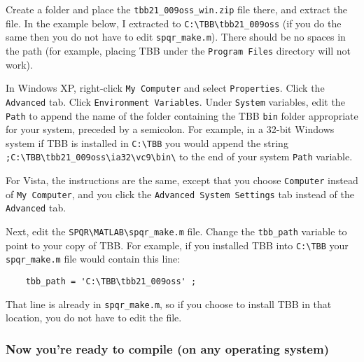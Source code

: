 \documentclass[12pt]{article}
\begin{document}
Create a folder and place the \verb'tbb21_009oss_win.zip' file there, and
extract the file.  In the example below, I extracted to
\verb'C:\TBB\tbb21_009oss' (if you do the same then you do not have to edit
\verb'spqr_make.m').  There should be no spaces in the path (for example,
placing TBB under the \verb'Program Files' directory will not work).

In Windows XP, right-click \verb'My Computer' and select \verb'Properties'.
Click the \verb'Advanced' tab.  Click \verb'Environment Variables'.  Under
\verb'System' variables, edit the \verb'Path' to append the name of the folder
containing the TBB \verb'bin' folder appropriate for your system, preceded by a
semicolon.  For example, in a 32-bit Windows system if TBB is installed in
\verb'C:\TBB' you would append the string
\verb';C:\TBB\tbb21_009oss\ia32\vc9\bin\' to the end of your system \verb'Path'
variable.

For Vista, the instructions are the same, except that you choose
\verb'Computer' instead of \verb'My Computer', and you click the
\verb'Advanced System Settings' tab instead of the \verb'Advanced' tab.

Next, edit the \verb'SPQR\MATLAB\spqr_make.m' file.  Change the \verb'tbb_path'
variable to point to your copy of TBB.  For example, if you installed TBB into
\verb'C:\TBB' your \verb'spqr_make.m' file would contain this line:

\begin{verbatim}
    tbb_path = 'C:\TBB\tbb21_009oss' ;
\end{verbatim}

That line is already in \verb'spqr_make.m', so if you choose to install TBB
in that location, you do not have to edit the file.

\subsubsection{Now you're ready to compile (on any operating system)}
\end{document}
